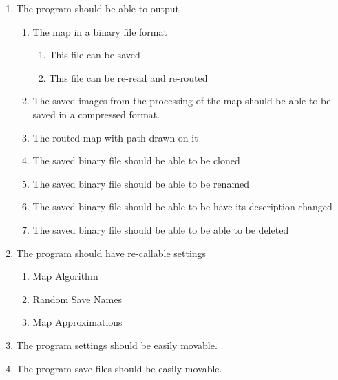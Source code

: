 \begin{FlushLeft}
        \begin{enumerate}[resume]
            \item The program should be able to output
            \begin{enumerate}
                \item The map in a binary file format
                \begin{enumerate}
                    \item This file can be saved
                    \item This file can be re-read and re-routed
                \end{enumerate}
                \item The saved images from the processing of the map should be able to be saved in a compressed format.
                \item The routed map with path drawn on it
                \item The saved binary file should be able to be cloned
                \item The saved binary file should be able to be renamed
                \item The saved binary file should be able to be have its description changed
                \item The saved binary file should be able to be able to be deleted                
            \end{enumerate}
            \item The program should have re-callable settings
            \begin{enumerate}
                \item Map Algorithm
                \item Random Save Names
                \item Map Approximations
            \end{enumerate}
            \item The program settings should be easily movable.
            \item The program save files should be easily movable.
        \end{enumerate}

        \bk


\end{FlushLeft}
